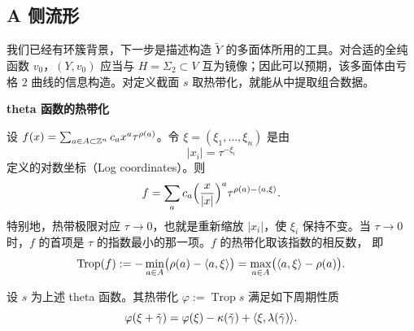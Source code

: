 \subsection{A 侧流形}

我们已经有环簇背景，下一步是描述构造 $\tilde Y$ 的多面体所用的工具。对合适的全纯函数
$v_0$，$(Y,v_0)$ 应当与 $H=\Sigma_2\subset V$ 互为镜像；因此可以预期，该多面体由亏格 $2$
曲线的信息构造。对定义截面 $s$ 取热带化，就能从中提取组合数据。

\medskip\noindent\textbf{theta 函数的热带化}\par

\begin{definition}\label{def:tropicalization}
设 $f(x)=\sum_{a\in A\subset\mathbb{Z}^n}c_ax^a\tau^{\rho(a)}$。令 $\xi=(\xi_1,\dots,\xi_n)$
是由
\[
|x_i|=\tau^{-\xi_i}
\]
定义的对数坐标（Log coordinates）。则
\[
f=\sum_a c_a\Bigl(\frac{x}{|x|}\Bigr)^a\tau^{\rho(a)-\langle a,\xi\rangle}.
\]
特别地，热带极限对应 $\tau\to0$，也就是重新缩放 $|x_i|$，使 $\xi_i$ 保持不变。当
$\tau\to0$ 时，$f$ 的首项是 $\tau$ 的指数最小的那一项。$f$ 的热带化取该指数的相反数，
即
\[
\operatorname{Trop}(f):=-\min_{a\in A}\bigl(\rho(a)-\langle a,\xi\rangle\bigr)
=\max_{a\in A}\bigl(\langle a,\xi\rangle-\rho(a)\bigr).
\]
\end{definition}


\begin{claim}\label{clm:periodicity}
设 $s$ 为上述 theta 函数。其热带化 $\varphi:=\operatorname{Trop}s$ 满足如下周期性质
\begin{equation}\label{eq:1-10}
\varphi(\xi+\tilde\gamma)=\varphi(\xi)-\kappa(\tilde\gamma)
+\langle \xi,\lambda(\tilde\gamma)\rangle.
\end{equation}
\end{claim}

